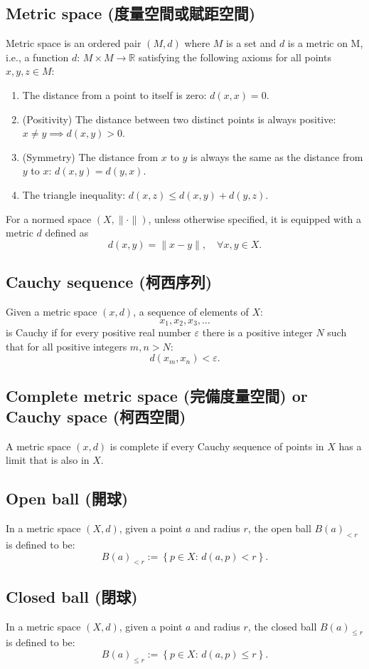 \documentclass[a4paper,12pt]{article}
\begin{document}
{{{\subsection{Metric space (度量空間或賦距空間)}
Metric space is an ordered pair $(M, d)$ where $M$ is a set and $d$ is a metric on M, i.e., a function $d:\,M\times M\to\mathbb{R}$ satisfying the following axioms for all points $x,y,z\in M$:
\begin{enumerate}
\item The distance from a point to itself is zero: $d(x,x)=0$.
\item (Positivity) The distance between two distinct points is always positive:$x\neq y\implies d(x,y)>0$.
\item (Symmetry) The distance from $x$ to $y$ is always the same as the distance from $y$ to $x$: $d(x,y)=d(y,x)$.
\item The triangle inequality: $d(x,z)\leq d(x,y)+d(y,z)$.
\end{enumerate}

For a normed space $(X,\|\cdot\|)$, unless otherwise specified, it is equipped with a metric $d$ defined as
\[d(x,y)=\|x-y\|,\quad \forall x,y\in X.\]
\subsection{Cauchy sequence (柯西序列)}
Given a metric space $(x,d)$, a sequence of elements of $X$:
\[x_1,x_2,x_3,\ldots\]
is Cauchy if for every positive real number $\varepsilon$ there is a positive integer $N$ such that for all positive integers $m,n>N$:
\[d\left(x_m,x_n\right)<\varepsilon.\]
\subsection{Complete metric space (完備度量空間) or Cauchy space (柯西空間)}
A metric space $(x,d)$ is complete if every Cauchy sequence of points in $X$ has a limit that is also in $X$.
\subsection{Open ball (開球)}
In a metric space $(X,d)$, given a point $a$ and radius $r$, the open ball $B(a)_{<r}$ is defined to be:
\[B(a)_{<r}:=\left\{p\in X:\, d(a,p)<r\right\}.\]
\subsection{Closed ball (閉球)}
In a metric space $(X,d)$, given a point $a$ and radius $r$, the closed ball $B(a)_{\leq r}$ is defined to be:
\[B(a)_{\leq r}:=\left\{p\in X:\, d(a,p)\leq r\right\}.\]
}}}
\end{document}

